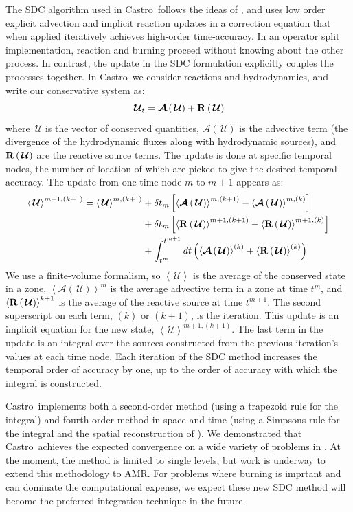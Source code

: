 \documentclass[a4paper]{jpconf}
\newcommand{\castro}{{\sffamily Castro}}
\newcommand{\Uc}{{\,\bm{\mathcal{U}}}}
\newcommand{\Advs}[1]{\boldsymbol{\mathcal{A}} \left(#1\right)}
\newcommand{\avg}[1]{{\left \langle #1 \right \rangle}}
\newcommand{\Rbs}[1]{{\bf R} \left ( #1 \right )}
\begin{document}
The SDC algorithm used in \castro\ follows the ideas of
\cite{dutt:2000,minion:2003}, and uses low order explicit advection
and implicit reaction updates in a correction equation that when
applied iteratively achieves high-order time-accuracy.  In an operator
split implementation, reaction and burning proceed without knowing
about the other process.  In contrast, the update in the SDC
formulation explicitly couples the processes together.  In \castro\ we
consider reactions and hydrodynamics, and write our conservative
system as:
\begin{equation}
\Uc_t = \Advs{\Uc} + \Rbs{\Uc}
\end{equation}
where $\Uc$ is the vector of conserved quantities, $\Advs{\Uc}$ is the
advective term (the divergence of the hydrodynamic fluxes along with
hydrodynamic sources), and $\Rbs{\Uc}$ are the reactive source terms.
The update is done at specific temporal nodes, the number of location
of which are picked to give the desired temporal accuracy.  The update
from one time node $m$ to $m+1$ appears as:
    \begin{align}
      \label{eq:sdc:general}
      \avg{\Uc}^{{m+1},(k+1)} = \avg{\Uc}^{m,(k+1)}
            &+ \delta t_m \left [ \avg{\Advs{\Uc}}^{m,(k+1)} - \avg{\Advs{\Uc}}^{m,(k)} \right ] \nonumber \\
            &+ \delta t_m \left [ \avg{\Rbs{\Uc}}^{{m+1},(k+1)} - \avg{\Rbs{\Uc}}^{{m+1},(k)} \right ] \nonumber \\
            &+ \int_{t^m}^{t^{m+1}} dt  \left (\avg{\Advs{\Uc}}^{(k)} + \avg{\Rbs{\Uc}}^{(k)}\right)
   \end{align}
We use a finite-volume formalism, so $\avg{\Uc}$ is the average of the
conserved state in a zone, $\avg{\Advs{\Uc}}^m$ is the average
advective term in a zone at time $t^m$, and $\avg{\Rbs{\Uc}}^{k+1}$ is
the average of the reactive source at time $t^{m+1}$.  The second
superscript on each term, $(k)$ or $(k+1)$, is the iteration.  This
update is an implicit equation for the new state,
$\avg{\Uc}^{{m+1},(k+1)}$.  The last term in the update is an integral
over the sources constructed from the previous iteration's values at
each time node.  Each iteration of the SDC method increases the
temporal order of accuracy by one, up to the order of accuracy with
which the integral is constructed.  

\castro\ implements both a second-order method (using a trapezoid rule
for the integral) and fourth-order method in space and time (using a
Simpsons rule for the integral and the spatial reconstruction of
\cite{mccorquodalecolella}).  We demonstrated that \castro\ achieves
the expected convergence on a wide variety of problems in
\cite{castro:sdc}.  At the moment, the method is limited to single
levels, but work is underway to extend this methodology to AMR.  For
problems where burning is imprtant and can dominate the computational
expense, we expect these new SDC method will become the preferred
integration technique in the future.
\end{document}
